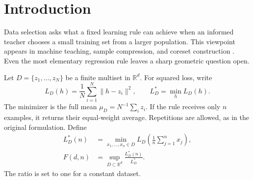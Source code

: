 \documentclass[twoside]{article}
\newcommand{\R}{\mathbb R}
\begin{document}
\runningauthor{}


\begin{abstract}
Suppose a learner may train the empirical mean on two optimally selected examples, with repetition, and is evaluated by squared loss on the full dataset. How much worse can this be than the full mean? This is the first open column in a recent data-selection problem. We determine the exact answer in every dimension: \[ F(d,2)=1+\max\left\{\frac13,\frac{d-1}{2d}\right\}. \] Thus the sharp factor is $4/3$ for $d\leq3$ and $(3d-1)/(2d)$ for $d\geq4$. The two branches reveal distinct obstructions. A rare point on a line forces the dimension-free term, while a uniform regular simplex forces the dimension term.

The proof gives a stronger convex-geometric theorem for distributions on at most $m$ atoms. Its key step is an explicit antithetic distribution over pairs. If one atom has mass at least $1/4$, a star coupling has exactly one third of the original second moment. Otherwise, a complete-graph coupling has a closed-form second moment, and a single Jensen inequality proves that uniform weights are worst. A variance-minimizing Carath\'eodory reduction then transfers the result to arbitrary finite datasets. This resolves all cases with selection budget two, supplies a short proof of the previously isolated planar case, and separates variance-normalized data selection from radius-normalized approximate Carath\'eodory bounds.
\end{abstract}

\section{Introduction}

Data selection asks what a fixed learning rule can achieve when an informed teacher chooses a small training set from a larger population. This viewpoint appears in machine teaching, sample compression, and coreset construction \citep{dasgupta2019teaching,feldman2020coresets,hanneke2025selection}. Even the most elementary regression rule leaves a sharp geometric question open.

Let $D=\{z_1,\ldots,z_N\}$ be a finite multiset in $\R^d$. For squared loss, write \[ L_D(h)=\frac1N\sum_{i=1}^N\|h-z_i\|^2, \qquad L_D^*=\min_h L_D(h). \] The minimizer is the full mean $\mu_D=N^{-1}\sum_i z_i$. If the rule receives only $n$ examples, it returns their equal-weight average. Repetitions are allowed, as in the original formulation. Define
\begin{align*}
 L_D^*(n)&=\min_{x_1,\ldots,x_n\in D}
 L_D\left(\frac1n\sum_{j=1}^n x_j\right),\\
 F(d,n)&=\sup_{D\subset\R^d}\frac{L_D^*(n)}{L_D^*}.
\end{align*}
The ratio is set to one for a constant dataset.
\end{document}
